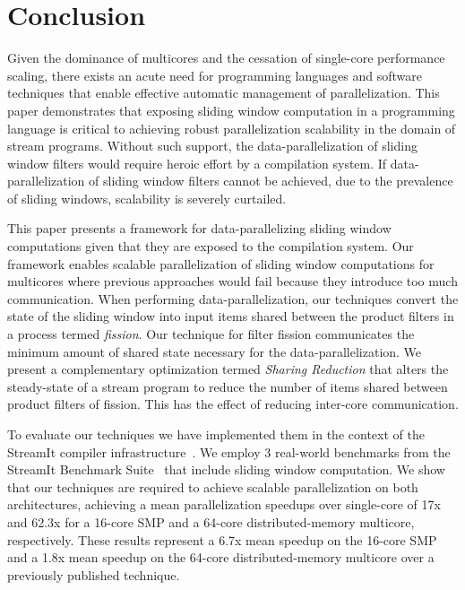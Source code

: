 \section{Conclusion}

Given the dominance of multicores and the cessation of single-core
performance scaling, there exists an acute need for programming
languages and software techniques that enable effective automatic
management of parallelization.  This paper demonstrates that exposing
sliding window computation in a programming language is critical to
achieving robust parallelization scalability in the domain of stream
programs.  Without such support, the data-parallelization of sliding
window filters would require heroic effort by a compilation system.
If data-parallelization of sliding window filters cannot be achieved,
due to the prevalence of sliding windows, scalability is severely
curtailed.

This paper presents a framework for data-parallelizing sliding window
computations given that they are exposed to the compilation system.  Our
framework enables scalable parallelization of sliding window
computations for multicores where previous approaches would fail
because they introduce too much communication.  When performing
data-parallelization, our techniques convert the state of the sliding
window into input items shared between the product filters in a
process termed {\it fission}.  Our technique for filter fission
communicates the minimum amount of shared state necessary for the
data-parallelization.  We present a complementary optimization termed
{\it Sharing Reduction} that alters the steady-state of a stream
program to reduce the number of items shared between product filters
of fission.  This has the effect of reducing inter-core communication.

To evaluate our techniques we have implemented them in the context of
the StreamIt compiler infrastructure~\cite{gordon-asplos06}.  We
employ 3 real-world benchmarks from the StreamIt Benchmark
Suite~\cite{streamit-suite} that include sliding window computation.
We show that our techniques are required to achieve scalable
parallelization on both architectures, achieving a mean
parallelization speedups over single-core of 17x and 62.3x for a
16-core SMP and a 64-core distributed-memory multicore, respectively.
These results represent a 6.7x mean speedup on the 16-core SMP and a
1.8x mean speedup on the 64-core distributed-memory multicore over a
previously published technique.


